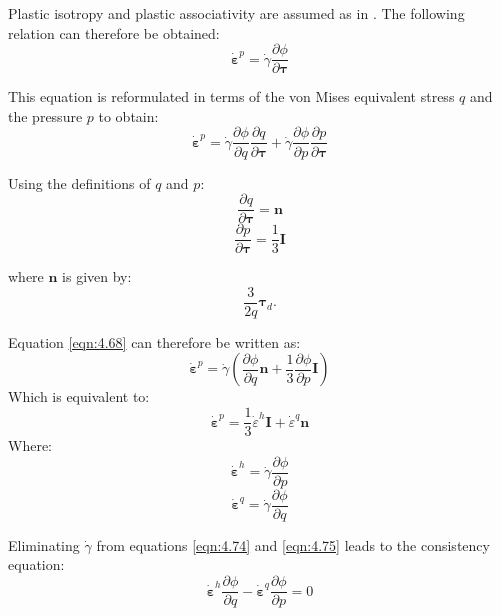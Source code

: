 \documentclass[sn-mathphys,Numbered,draft]{sn-jnl}%
\begin{document}
Plastic isotropy and plastic associativity are assumed as in \citet{bettaieb_numerical_2011}. The following relation can therefore be obtained:
\begin{equation}
\label{eqn:4.67}
	\dot{\boldsymbol{\varepsilon}}^p=\dot{\gamma}\frac{\partial\phi}{\partial\boldsymbol{\tau}}	
\end{equation}

This equation is reformulated in terms of the von Mises equivalent stress $q$ and the pressure $p$ to obtain:
\begin{equation}
	\label{eqn:4.68}
 \dot{\boldsymbol{\varepsilon}}^p=\dot{\gamma}\frac{\partial\phi}{\partial q}\frac{\partial q}{\partial\boldsymbol{\tau}}+\dot{\gamma}\frac{\partial\phi}{\partial p}\frac{\partial p}{\partial\boldsymbol{\tau}}
\end{equation}

Using the definitions of $q$ and $p$:
\begin{equation}
	\frac{\partial q}{\partial\boldsymbol{\tau}}=\mathbf{n}
 \end{equation}
 \begin{equation}
 \frac{\partial p}{\partial\boldsymbol{\tau}}=\frac{1}{3}\mathbf{I}	
\end{equation}

where $\mathbf{n}$ is given by:
\begin{equation}
\frac{3}{2q}\mathbf{\tau}_d.
\end{equation}

Equation \ref{eqn:4.68} can therefore be written as:
\begin{equation}
	\dot{\boldsymbol{\varepsilon}}^p=\dot{\gamma}\left(\frac{\partial\phi}{\partial q}\mathbf{n}+\frac{1}{3}\frac{\partial\phi}{\partial p}\mathbf{I}\right)	
\end{equation}
Which is equivalent to:
\begin{equation}
\label{eqn:4.73}
\dot{\boldsymbol{\varepsilon}}^p=\frac{1}{3} \dot{\varepsilon}^h \boldsymbol{I}+\dot{\varepsilon}^q \boldsymbol{n}
\end{equation}
Where:
\begin{equation}
\label{eqn:4.74}
\dot{ \boldsymbol{\varepsilon}}^h=\dot{\gamma} \frac{\partial \phi}{\partial p} 
\end{equation}
\begin{equation}
\label{eqn:4.75}
\dot{ \boldsymbol{\varepsilon}}^q=\dot{\gamma} \frac{\partial \phi}{\partial q}
\end{equation}

Eliminating $\dot{\gamma}$ from equations \ref{eqn:4.74}
and \ref{eqn:4.75} leads to the consistency equation:
\begin{equation}
\dot{ \boldsymbol{\varepsilon}}^h \frac{\partial \phi}{\partial q}-\dot{ \boldsymbol{\varepsilon}}^q \frac{\partial \phi}{\partial p}=0
\end{equation}
\end{document}
